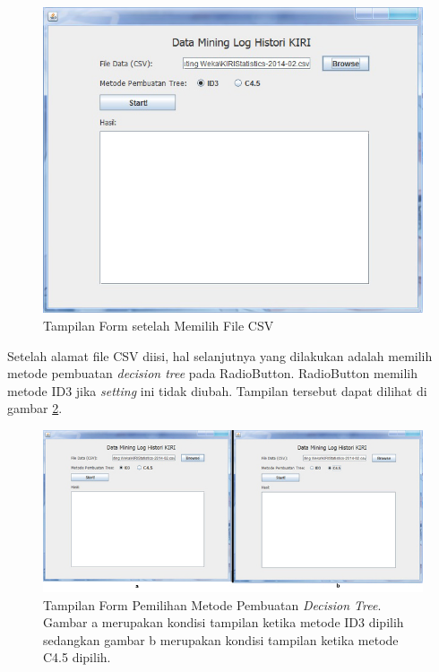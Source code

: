 \begin{figure}[H]
\centering
\includegraphics[scale=0.7]{Gambar/GUI3.jpg}
\caption[Tampilan Form setelah Memilih File CSV]{Tampilan Form setelah Memilih File CSV} 
\label{fig:GUI3}
\end{figure}

Setelah alamat file CSV diisi, hal selanjutnya yang dilakukan adalah memilih metode pembuatan \textsl{decision tree} pada RadioButton. RadioButton memilih metode ID3 jika \textsl{setting} ini tidak diubah. Tampilan tersebut dapat dilihat di gambar \ref{fig:GUI3and4}.

\begin{figure}[H]
\centering
\includegraphics[scale=0.5]{Gambar/GUI3and4.jpg}
\caption[Tampilan Form Pemilihan Metode Pembuatan \textsl{Decision Tree}]{Tampilan Form Pemilihan Metode Pembuatan \textsl{Decision Tree}. Gambar a merupakan kondisi tampilan ketika metode ID3 dipilih sedangkan gambar b merupakan kondisi tampilan ketika metode C4.5 dipilih.} 
\label{fig:GUI3and4}
\end{figure}

